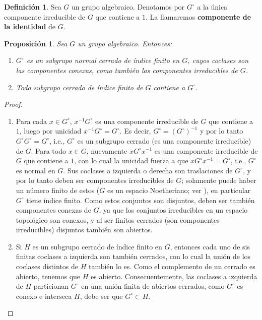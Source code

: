 \documentclass[spanish,10pt]{amsart}
\newtheorem{proposition}[theorem]{Proposición}
\theoremstyle{definition}
\newtheorem{definition}[theorem]{Definición}
\theoremstyle{remark}
\numberwithin{equation}{section}
\begin{document}
\begin{definition}
Sea $G$ un grupo algebraico. Denotamos por $G^\circ$ a la única componente irreducible de $G$ que contiene a $1$. La llamaremos \textbf{componente de la identidad} de $G$.
\end{definition}

\begin{proposition}\label{proposicion:componente de la identidad}
Sea $G$ un grupo algebraico. Entonces:
\begin{enumerate}[(1)]
\item $G^\circ$ es un subgrupo normal cerrado de índice finito en $G$, cuyos coclases son las componentes conexas, como también las componentes irreducibles de $G$.
\item Todo subgrupo cerrado de índice finito de $G$ contiene a $G^\circ$.
\end{enumerate}
\end{proposition}
\begin{proof}
\begin{enumerate}[(1)]
\item Para cada $x \in G^\circ$, $x^{-1} G^\circ$ es una componente irreducible de $G$ que contiene a $1$, luego por unicidad $x^{-1} G^\circ = G^{\circ}$. Es decir, $G^\circ = (G^{\circ})^{-1}$ y por lo tanto $G^\circ G^\circ = G ^\circ$, i.e., $G^\circ$ es un subgrupo cerrado (es una componente irreducible) de $G$. Para todo $x \in G$, nuevamente $x G^{\circ} x^{-1}$ es una componente irreducible de $G$ que contiene a $1$, con lo cual la unicidad fuerza a que $x G^\circ x^{-1} = G^{\circ}$, i.e., $G^\circ$ es normal en $G$. Sus coclases a izquierda o derecha son traslaciones de $G^\circ$, y por lo tanto deben ser componentes irreducibles de $G$; solamente puede haber un número finito de estos ($G$ es un espacio Noetheriano; ver \cite[Teorema 2.8.9.]{notas_pedro}), en particular $G^\circ$ tiene índice finito. Como estos conjuntos son disjuntos, deben ser también componentes conexas de $G$, ya que los conjuntos irreducibles en un espacio topológico son conexos, y al ser finitos cerrados (son componentes irreducibles) disjuntos también son abiertos.
\item Si $H$ es un subgrupo cerrado de índice finito en $G$, entonces cada uno de sis finitas coclases a izquierda son también cerrados, con lo cual la unión de los coclases distintos de $H$ también lo es. Como el complemento de un cerrado es abierto, tenemos que $H$ es abierto. Consecuentemente, las coclases a izquierda de $H$ particionan $G^\circ$ en una unión finita de abiertos-cerrados, como $G^\circ$ es conexo e interseca $H$, debe ser que $G^\circ \subset H$.
\end{enumerate}
\end{proof}
\end{document}
